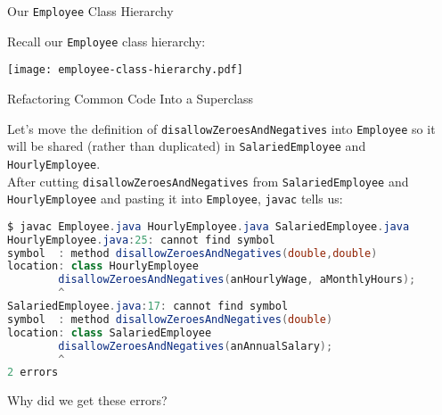 \documentclass{beamer}
\author[Chris Simpkins] 
{Christopher Simpkins \\\texttt{chris.simpkins@gatech.edu}}
\institute[Georgia Tech] %
\date[CS 1331]{}
\title[\course] %
{\lesson}
\subtitle{}
\begin{document}
\begin{frame}
  \titlepage
\end{frame}


\begin{frame}[fragile]{Our {\tt Employee} Class Hierarchy}


Recall our {\tt Employee} class hierarchy:
\vspace{-.1in}
\begin{center}
\texttt{[image: employee-class-hierarchy.pdf]}
\end{center}


\end{frame}

\begin{frame}[fragile]{Refactoring Common Code Into a Superclass}


Let's move the definition of {\tt disallowZeroesAndNegatives} into {\tt Employee} so it will be shared (rather than duplicated) in {\tt SalariedEmployee} and {\tt HourlyEmployee}.\\
\vspace{.05in}
After cutting {\tt disallowZeroesAndNegatives} from {\tt SalariedEmployee} and {\tt HourlyEmployee} and pasting it into {\tt Employee}, {\tt javac} tells us:
\vspace{-.1in}
\begin{lstlisting}[language=Java]
$ javac Employee.java HourlyEmployee.java SalariedEmployee.java
HourlyEmployee.java:25: cannot find symbol
symbol  : method disallowZeroesAndNegatives(double,double)
location: class HourlyEmployee
        disallowZeroesAndNegatives(anHourlyWage, aMonthlyHours);
        ^
SalariedEmployee.java:17: cannot find symbol
symbol  : method disallowZeroesAndNegatives(double)
location: class SalariedEmployee
        disallowZeroesAndNegatives(anAnnualSalary);
        ^
2 errors
\end{lstlisting}
\vspace{-.1in}
Why did we get these errors?

\end{frame}
\end{document}
